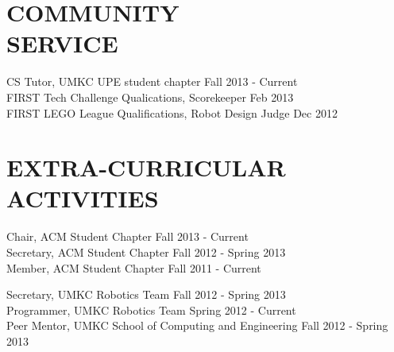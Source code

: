 \documentclass[line,margin]{res}
\begin{document}
\begin{resume}
\section{COMMUNITY \\ SERVICE}  
            	CS Tutor, UMKC UPE student chapter  \hfill Fall 2013 - Current \\
                FIRST Tech Challenge Qualications, Scorekeeper \hfill Feb 2013 \\
		FIRST LEGO League Qualifications, Robot Design Judge \hfill Dec 2012 
	
\section{EXTRA-CURRICULAR \\ ACTIVITIES}             
		Chair, ACM Student Chapter \hfill Fall 2013 - Current \\
		Secretary, ACM Student Chapter \hfill Fall 2012 - Spring 2013 \\	
		Member, ACM Student Chapter \hfill Fall 2011 - Current 
		
		Secretary, UMKC Robotics Team \hfill  Fall 2012 - Spring 2013 \\	
		Programmer, UMKC Robotics Team \hfill Spring 2012 - Current \\

		Peer Mentor, UMKC School of Computing and Engineering \hfill Fall 2012 - Spring 2013 \\	
\end{resume}
\end{document}
